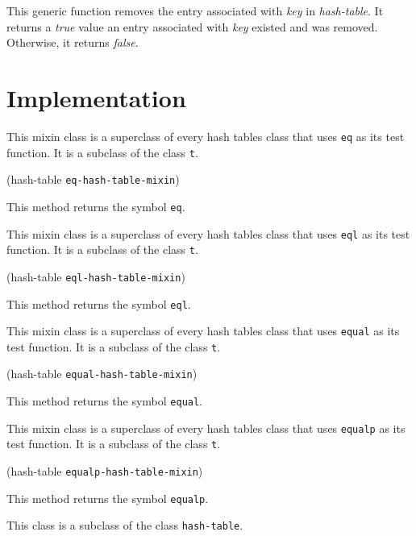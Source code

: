 This generic function removes the entry associated with \textit{key}
in \textit{hash-table}.  It returns a \textsl{true} value an entry
associated with \textit{key} existed and was removed.  Otherwise,
it returns \textsl{false}.

\section{Implementation}


This mixin class is a superclass of every hash tables class that uses
\texttt{eq} as its test function.  It is a subclass of the class
\texttt{t}.

{\small{} {(hash-table {\tt eq-hash-table-mixin})}
}

This method returns the symbol \texttt{eq}.


This mixin class is a superclass of every hash tables class that uses
\texttt{eql} as its test function.  It is a subclass of the class
\texttt{t}.

{\small{} {(hash-table {\tt eql-hash-table-mixin})}
}

This method returns the symbol \texttt{eql}.


This mixin class is a superclass of every hash tables class that uses
\texttt{equal} as its test function.  It is a subclass of the class
\texttt{t}.

{\small{} {(hash-table {\tt equal-hash-table-mixin})}
}

This method returns the symbol \texttt{equal}.


This mixin class is a superclass of every hash tables class that uses
\texttt{equalp} as its test function.  It is a subclass of the class
\texttt{t}.

{\small{} {(hash-table {\tt equalp-hash-table-mixin})}
}

This method returns the symbol \texttt{equalp}.


This class is a subclass of the class \texttt{hash-table}.



